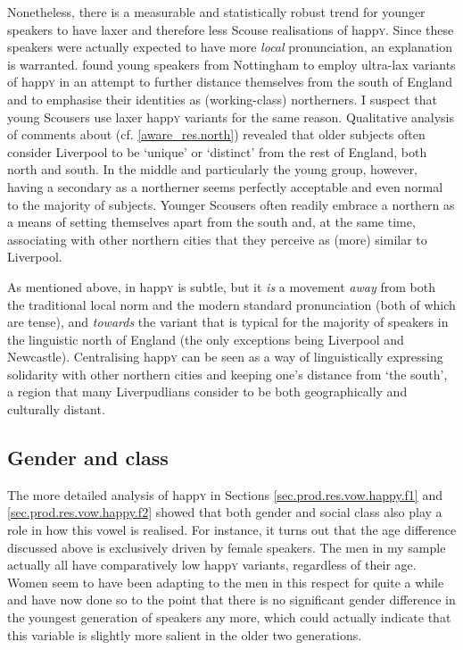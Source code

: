 Nonetheless, there is a measurable and statistically robust trend for younger speakers to have laxer and therefore less Scouse realisations of happ\textsc{y}.
Since these speakers were actually expected to have more \emph{local} pronunciation, an explanation is warranted.
\textcite{flynn2010} found young speakers from Nottingham to employ ultra-lax variants of happ\textsc{y} in an attempt to further distance themselves from the south of England and to emphasise their identities as (working-class) northerners.
I suspect that young Scousers use laxer happ\textsc{y} variants for the same reason.
Qualitative analysis of comments about  (cf. \ref{aware_res.north}) revealed that older subjects often consider Liverpool to be `unique' or `distinct' from the rest of England, both north and south.
In the middle and particularly the young group, however, having a secondary  as a northerner seems perfectly acceptable and even normal to the majority of subjects.
Younger Scousers often readily embrace a northern  as a means of setting themselves apart from the south and, at the same time, associating with other northern cities that they perceive as (more) similar to Liverpool.

As mentioned above,  in happ\textsc{y} is subtle, but it \emph{is} a movement \emph{away} from both the traditional local norm and the modern standard pronunciation (both of which are tense), and \emph{towards} the variant that is typical for the majority of speakers in the linguistic north of England (the only exceptions being Liverpool and Newcastle).
Centralising happ\textsc{y} can be seen as a way of linguistically expressing solidarity with other northern cities and keeping one's distance from `the south', a region that many Liverpudlians consider to be both geographically and culturally distant.

\subsection{Gender and class}
\label{prod.disc.happy.social}

The more detailed analysis of happ\textsc{y} in Sections \ref{sec.prod.res.vow.happy.f1} and \ref{sec.prod.res.vow.happy.f2} showed that both gender and social class also play a role in how this vowel is realised.
For instance, it turns out that the age difference discussed above is exclusively driven by female speakers.
The men in my sample actually all have comparatively low happ\textsc{y} variants, regardless of their age.
Women seem to have been adapting to the men in this respect for quite a while and have now done so to the point that there is no significant gender difference in the youngest generation of speakers any more, which could actually indicate that this variable is slightly more salient in the older two generations.

